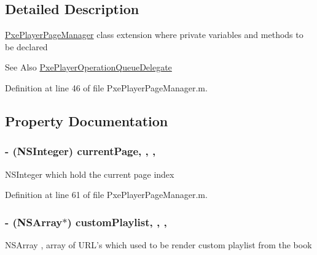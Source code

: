\subsection{Detailed Description}
\hyperlink{interface_pxe_player_page_manager}{Pxe\-Player\-Page\-Manager} class extension where private variables and methods to be declared \begin{DoxySeeAlso}{See Also}
\hyperlink{class_pxe_player_operation_queue_delegate-p}{Pxe\-Player\-Operation\-Queue\-Delegate} 
\end{DoxySeeAlso}


Definition at line 46 of file Pxe\-Player\-Page\-Manager.\-m.



\subsection{Property Documentation}
\hypertarget{category_pxe_player_page_manager_07_08_a05c4bdb4a35995cd2323311a4ddd5990}{
\subsubsection[{current\-Page}]{\setlength{\rightskip}{0pt plus 5cm}-\/ (N\-S\-Integer) current\-Page\hspace{0.3cm}{\ttfamily [read]}, {\ttfamily [write]}, {\ttfamily [nonatomic]}, {\ttfamily [assign]}}}\label{category_pxe_player_page_manager_07_08_a05c4bdb4a35995cd2323311a4ddd5990}
N\-S\-Integer which hold the current page index 

Definition at line 61 of file Pxe\-Player\-Page\-Manager.\-m.

\hypertarget{category_pxe_player_page_manager_07_08_ada0666ce9183a61c6523ccd9eaf56382}{
\subsubsection[{custom\-Playlist}]{\setlength{\rightskip}{0pt plus 5cm}-\/ (N\-S\-Array$\ast$) custom\-Playlist\hspace{0.3cm}{\ttfamily [read]}, {\ttfamily [write]}, {\ttfamily [nonatomic]}, {\ttfamily [strong]}}}\label{category_pxe_player_page_manager_07_08_ada0666ce9183a61c6523ccd9eaf56382}
N\-S\-Array , array of U\-R\-L's which used to be render custom playlist from the book 

